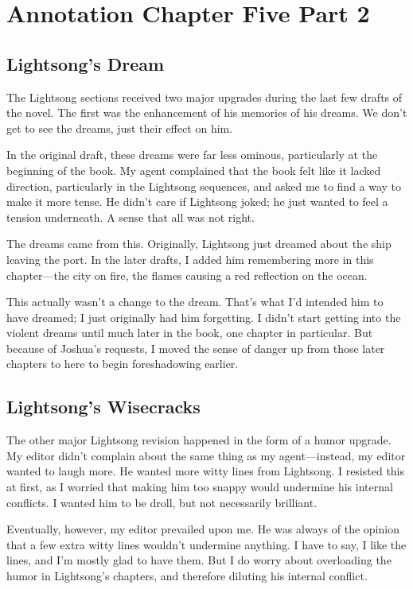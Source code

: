 \section{Annotation Chapter Five Part 2}

\subsection*{Lightsong’s Dream}

The Lightsong sections received two major upgrades during the last few drafts of the novel. The first was the enhancement of his memories of his dreams. We don’t get to see the dreams, just their effect on him.

In the original draft, these dreams were far less ominous, particularly at the beginning of the book. My agent complained that the book felt like it lacked direction, particularly in the Lightsong sequences, and asked me to find a way to make it more tense. He didn’t care if Lightsong joked; he just wanted to feel a tension underneath. A sense that all was not right.

The dreams came from this. Originally, Lightsong just dreamed about the ship leaving the port. In the later drafts, I added him remembering more in this chapter—the city on fire, the flames causing a red reflection on the ocean.

This actually wasn’t a change to the dream. That’s what I’d intended him to have dreamed; I just originally had him forgetting. I didn’t start getting into the violent dreams until much later in the book, one chapter in particular. But because of Joshua’s requests, I moved the sense of danger up from those later chapters to here to begin foreshadowing earlier.

\subsection*{Lightsong’s Wisecracks}

The other major Lightsong revision happened in the form of a humor upgrade. My editor didn’t complain about the same thing as my agent—instead, my editor wanted to laugh more. He wanted more witty lines from Lightsong. I resisted this at first, as I worried that making him too snappy would undermine his internal conflicts. I wanted him to be droll, but not necessarily brilliant.

Eventually, however, my editor prevailed upon me. He was always of the opinion that a few extra witty lines wouldn’t undermine anything. I have to say, I like the lines, and I’m mostly glad to have them. But I do worry about overloading the humor in Lightsong’s chapters, and therefore diluting his internal conflict.

